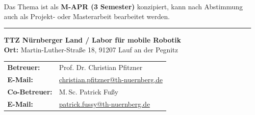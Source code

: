 \documentclass{ohm_project_description}
\begin{document}
\vspace{0.5cm}
Das Thema ist als \textbf{M-APR (3 Semester)} konzipiert, kann nach Abstimmung auch als Projekt- oder Masterarbeit bearbeitet werden.

\vfill
\textcolor{ohm_red}{\rule{\linewidth}{0.4mm}}
\textbf{\textcolor{ohm_red}{TTZ Nürnberger Land / Labor für mobile Robotik}} \\
\textbf{Ort:} Martin-Luther-Straße 18, 91207 Lauf an der Pegnitz \\[4pt]
\begin{tabular}{@{}ll}
\textbf{Betreuer:}   & Prof. Dr. Christian Pfitzner \\
\textbf{E-Mail:}     & \href{mailto:christian.pfitzner@th-nuernberg.de}{christian.pfitzner@th-nuernberg.de} \\
\textbf{Co-Betreuer:} & M.\,Sc. Patrick Fußy \\
\textbf{E-Mail:}     & \href{mailto:patrick.fussy@th-nuernberg.de}{patrick.fussy@th-nuernberg.de} \\
\end{tabular}
\end{document}
